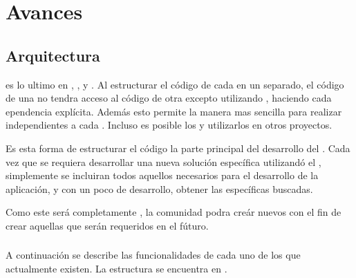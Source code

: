 
\chapter{Avances}

\section{Arquitectura}

\packagesAS es lo ultimo en \codeSeparationQA, \modularityAS, y \reusabilityQA. Al estructurar el código de cada \featureCPT en un \packagesAS separado, el código de una \featureCPT no tendra acceso al código de otra \featureCPT excepto utilizando \exportCPT, haciendo cada ependencia explícita. Además esto permite la manera mas sencilla para realizar \testingCPT independientes a cada \featureCPT. Incluso es posible \publishINT los \packagesAS y utilizarlos en otros proyectos.

Es esta forma de estructurar el código la parte principal del desarrollo del \frameworkPC \ecommerce. Cada vez que se requiera desarrollar una nueva solución específica utilizandó el \frameworkPC, simplemente se incluiran todos aquellos \modulesAS necesarios para el desarrollo de la aplicación, y con un poco de desarrollo, obtener las \featuresCPT específicas buscadas.

Como este \frameworkPC será completamente \openSourcePC, la comunidad podra creár nuevos \modulesAS con el fin de crear aquellas \featuresCPT que serán requeridos en el fúturo.



\subsection{\packagesAS}

A continuación se describe las funcionalidades de cada uno de los \packagesAS que actualmente existen. La estructura se encuentra en .

